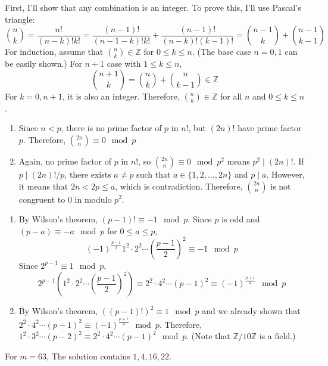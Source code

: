 \documentclass[12pt]{article}
\newenvironment{problem}[2][Problem]{\begin{trivlist}
\item[\hskip \labelsep {\bfseries #1}\hskip \labelsep {\bfseries #2.}]}{\end{trivlist}}
\begin{document}
\begin{problem}{2}
\end{problem}
First, I'll show that any combination is an integer. To prove this, I'll use Pascal's triangle:
\begin{equation*}
    \binom{n}{k}=\frac{n!}{(n-k)!k!}=\frac{(n-1)!}{(n-1-k)!k!}+\frac{(n-1)!}{(n-k)!(k-1)!}=\binom{n-1}{k}+\binom{n-1}{k-1}
\end{equation*}
For induction, assume that $\binom{n}{k}\in\mathbb{Z}$ for $0\leq k\leq n$. (The base case $n=0,1$ can be easily shown.) For $n+1$ case with $1\leq k\leq n$,
\begin{equation*}
    \binom{n+1}{k}=\binom{n}{k}+\binom{n}{k-1} \in\mathbb{Z}
\end{equation*}
For $k=0,n+1$, it is also an integer. Therefore, $\binom{n}{k}\in\mathbb{Z}$ for all $n$ and $0\leq k\leq n$.
\begin{enumerate}
    \item[(i)] Since $n<p$, there is no prime factor of $p$ in $n!$, but $(2n)!$ have prime factor $p$. Therefore, $\binom{2n}{n}\equiv 0 \mod p$
    \item[(ii)] Again, no prime factor of $p$ in $n!$, so $\binom{2n}{n}\equiv 0 \mod p^2$ means $p^2\mid (2n)!$. If $p\mid (2n)!/p$, there exists $a\neq p$ such that $a\in\{1,2,\ldots, 2n\}$ and $p\mid a$. However, it means that $2n< 2p\leq a$, which is contradiction. Therefore, $\binom{2n}{n}$ is not congruent to $0$ in modulo $p^2$.
\end{enumerate}
\begin{problem}{3}
\end{problem}
\begin{enumerate}
    \item [(i)] By Wilson's theorem, $(p-1)!\equiv -1 \mod p$. Since $p$ is odd and $(p-a)\equiv -a \mod p$ for $0\leq a\leq p$, \begin{equation*}
    (-1)^{\frac{p-1}{2}}1^2 \cdot 2^2 \cdots \left(\frac{p-1}{2}\right)^2\equiv -1 \mod p
\end{equation*}
Since $2^{p-1}\equiv 1 \mod p$,
\begin{equation*}
    2^{p-1}\left(1^2\cdot 2^2 \cdots \left(\frac{p-1}{2}\right)^2\right)\equiv 2^2\cdot 4^2\cdots (p-1)^2\equiv (-1)^{\frac{p+1}{2}} \mod p
\end{equation*}
    \item[(ii)] By Wilson's theorem, $\left((p-1)!\right)^2\equiv 1 \mod p$ and we already shown that $2^2\cdot 4^2\cdots (p-1)^2\equiv (-1)^{\frac{p+1}{2}} \mod p$. Therefore, $1^2\cdot 3^2\cdots (p-2)^2\equiv 2^2\cdot 4^2\cdots (p-1)^2 \mod p$. (Note that $\mathbb{Z}/10\mathbb{Z}$ is a field.)
\end{enumerate}
\newpage
\begin{problem}{4}
For $m=63$, The solution contains $1,4,16,22$.
\end{problem}
\end{document}
